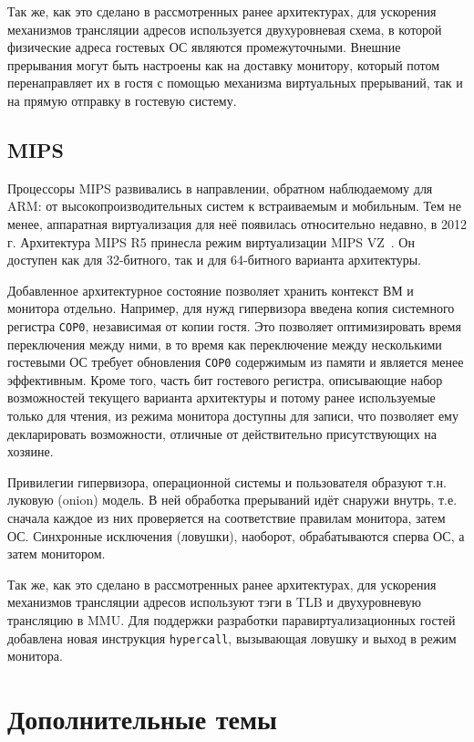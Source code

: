 Так же, как это сделано в рассмотренных ранее архитектурах, для ускорения механизмов трансляции адресов используется двухуровневая схема, в которой физические адреса гостевых ОС являются промежуточными. Внешние прерывания могут быть настроены как на доставку монитору, который потом перенаправляет их в гостя с помощью механизма виртуальных прерываний, так и на прямую отправку в гостевую систему.

\subsection{MIPS}

Процессоры MIPS развивались в направлении, обратном наблюдаемому для ARM: от высокопроизводительных систем к встраиваемым и мобильным. Тем не менее, аппаратная виртуализация для неё появилась относительно недавно, в 2012 г. Архитектура MIPS R5 принесла режим виртуализации MIPS VZ~\cite{mips-vz}. Он доступен как для 32-битного, так и для 64-битного варианта архитектуры.

Добавленное архитектурное состояние позволяет хранить контекст ВМ и монитора отдельно. Например, для нужд гипервизора введена копия системного регистра \texttt{COP0}, независимая от копии гостя. Это позволяет оптимизировать время переключения между ними, в то время как переключение между несколькими гостевыми ОС требует обновления \texttt{COP0} содержимым из памяти и является менее эффективным. Кроме того, часть бит гостевого регистра, описывающие набор возможностей текущего варианта архитектуры и потому ранее используемые только для чтения, из режима монитора доступны для записи, что позволяет ему декларировать возможности, отличные от действительно присутствующих на хозяине.

Привилегии гипервизора, операционной системы и пользователя образуют т.н. луковую (\abbr onion) модель. В ней обработка прерываний идёт снаружи внутрь, т.е. сначала каждое из них проверяется на соответствие правилам монитора, затем ОС. Синхронные исключения (ловушки), наоборот, обрабатываются сперва ОС, а затем монитором.

Так же, как это сделано в рассмотренных ранее архитектурах, для ускорения механизмов трансляции адресов используют тэги в TLB и двухуровневую трансляцию в MMU. Для поддержки разработки паравиртуализационных гостей добавлена новая инструкция \texttt{hypercall}, вызывающая ловушку и выход в режим монитора.

\section{Дополнительные темы}

